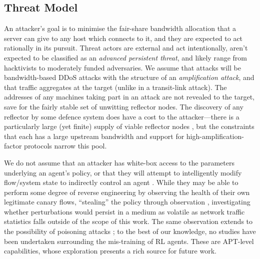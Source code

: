 \documentclass[conference, letterpaper, 10pt, times]{IEEEtran}
\begin{document}
\subsection{Threat Model}


An attacker's goal is to minimise the fair-share bandwidth allocation that a server can give to any host which connects to it, and they are expected to act rationally in its pursuit.
Threat actors are external and act intentionally, aren't expected to be classified as an \emph{advanced persistent threat}, and likely range from hacktivists to moderately funded adversaries.
We assume that attacks will be bandwidth-based DDoS attacks with the structure of an \emph{amplification attack}, and that traffic aggregates at the target (unlike in a transit-link attack).
The addresses of any machines taking part in an attack are not revealed to the target, save for the fairly stable set of unwitting reflector nodes.
The discovery of any reflector by some defence system does have a cost to the attacker---there is a particularly large (yet finite) supply of viable reflector nodes \cite{DBLP:conf/ndss/Rossow14}, but the constraints that each has a large upstream bandwidth and support for high-amplification-factor protocols narrow this pool.

We do not assume that an attacker has white-box access to the parameters underlying an agent's policy, or that they will attempt to intelligently modify flow/system state to indirectly control an agent \cite{DBLP:conf/eurosp/PapernotMJFCS16, DBLP:conf/eurosp/PapernotMSW18, DBLP:journals/corr/HuangPGDA17, DBLP:conf/sp/Carlini017}.
While they may be able to perform some degree of reverse engineering by observing the health of their own legitimate canary flows, ``stealing'' the policy through observation \cite{DBLP:conf/uss/TramerZJRR16}, investigating whether perturbations would persist in a medium as volatile as network traffic statistics falls outside of the scope of this work.
The same observation extends to the possibility of poisoning attacks \cite{DBLP:journals/jmlr/KloftL10, DBLP:conf/acsac/ShenTS16}; to the best of our knowledge, no studies have been undertaken surrounding the mis-training of RL agents.
These are APT-level capabilities, whose exploration presents a rich source for future work.
\end{document}
